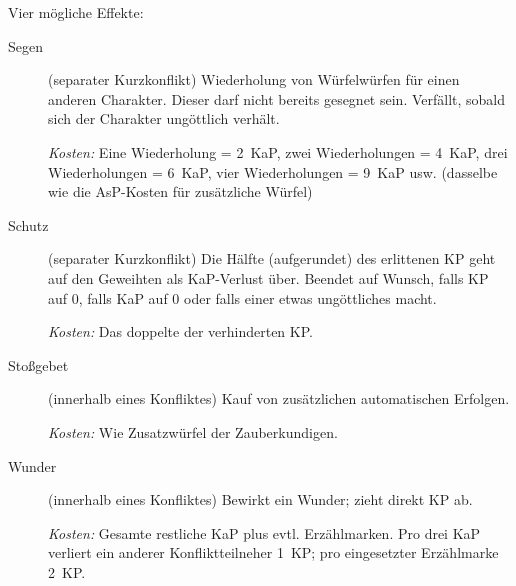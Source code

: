 Vier mögliche Effekte:
\begin{description}
\item[Segen] (separater Kurzkonflikt) Wiederholung von Würfelwürfen für einen anderen Charakter. Dieser darf nicht bereits gesegnet sein. Verfällt, sobald sich der Charakter ungöttlich verhält.

\emph{Kosten:} Eine Wiederholung = 2~KaP, zwei Wiederholungen = 4~KaP, drei Wiederholungen = 6~KaP, vier Wiederholungen = 9~KaP usw. (dasselbe wie die AsP-Kosten für zusätzliche Würfel)

\item[Schutz] (separater Kurzkonflikt) Die Hälfte (aufgerundet) des erlittenen KP geht auf den Geweihten als KaP-Verlust über. Beendet auf Wunsch, falls KP auf 0, falls KaP auf 0 oder falls einer etwas ungöttliches macht.

\emph{Kosten:} Das doppelte der verhinderten KP.

\item[Stoßgebet] (innerhalb eines Konfliktes) Kauf von zusätzlichen automatischen Erfolgen.

\emph{Kosten:} Wie Zusatzwürfel der Zauberkundigen.

\item[Wunder] (innerhalb eines Konfliktes) Bewirkt ein Wunder; zieht direkt KP ab.

\emph{Kosten:} Gesamte restliche KaP plus evtl. Erzählmarken. Pro drei KaP verliert ein anderer Konfliktteilneher 1~KP; pro eingesetzter Erzählmarke 2~KP.
\end{description}


